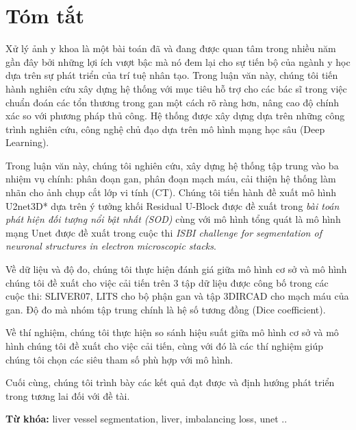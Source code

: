 \chapter*{Tóm tắt}
\onehalfspacing
\vspace{1.0cm}
Xử lý ảnh y khoa là một bài toán đã và đang được quan tâm trong nhiều năm gần đây bởi những lợi ích vượt bậc mà nó đem lại cho sự tiến bộ của ngành y học dựa trên sự phát triển của trí tuệ nhân tạo. Trong luận văn này, chúng tôi tiến hành nghiên cứu xây dựng hệ thống với mục tiêu hỗ trợ cho các bác sĩ trong việc chuẩn đoán các tổn thương trong gan một cách rõ ràng hơn, nâng cao độ chính xác so với phương pháp thủ công. Hệ thống được xây dựng dựa trên những công trình nghiên cứu, công nghệ chủ đạo dựa trên mô hình mạng học sâu (Deep Learning). \par


Trong luận văn này, chúng tôi nghiên cứu, xây dựng hệ thống tập trung vào ba nhiệm vụ chính: phân đoạn gan, phân đoạn mạch máu, cải thiện hệ thống làm nhãn cho ảnh chụp cắt lớp vi tính (CT). Chúng tôi tiến hành đề xuất mô hình U2net3D* dựa trên ý tưởng khối Residual U-Block được đề xuất trong \textit{bài toán phát hiện đối tượng nổi bật nhất (SOD)} cùng với mô hình tổng quát là mô hình mạng Unet được đề xuất trong cuộc thi \textit{ISBI challenge for segmentation of neuronal structures in electron microscopic stacks}. 

Về dữ liệu và độ đo, chúng tôi thực hiện đánh giá giữa mô hình cơ sở và mô hình chúng tôi đề xuất cho việc cải tiến trên 3 tập dữ liệu được công bố trong các cuộc thi: SLIVER07, LITS cho bộ phận gan và tập 3DIRCAD cho mạch máu của gan. Độ đo mà nhóm tập trung chính là hệ số tương đồng (Dice coefficient). 

Về thí nghiệm, chúng tôi thực hiện so sánh hiệu suất giữa mô hình cơ sở và mô hình chúng tôi đề xuất cho việc cải tiến, cùng với đó là các thí nghiệm giúp chúng tôi chọn các siêu tham số phù hợp với mô hình. 

Cuối cùng, chúng tôi trình bày các kết quả đạt được và định hướng phát triển trong tương lai đối với đề tài.

\textbf{Từ khóa:} liver vessel segmentation, liver, imbalancing loss, unet ..
\vskip 0.5cm
